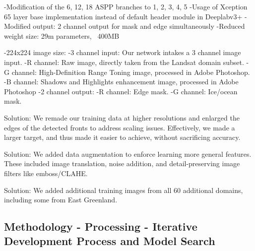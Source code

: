 \documentclass[tc, manuscript]{copernicus}
\begin{document}
-Modification of the 6, 12, 18 ASPP branches to 1, 2, 3, 4, 5
-Usage of Xception 65 layer base implementation instead of default header module in Deeplabv3+
-Modified output: 2 channel output for mask and edge simultaneously
-Reduced weight size: 29m parameters, ~400MB


-224x224 image size: 
-3 channel input: Our network intakes a 3 channel image input.
    -R channel: Raw image, directly taken from the Landsat domain subset.
    -G channel: High-Definition Range Toning image, processed in Adobe Photoshop.
    -B channel: Shadows and Highlights enhancement image, processed in Adobe Photoshop
-2 channel output:
    -R channel: Edge mask. 
    -G channel: Ice/ocean mask.


Solution: We remade our training data at higher resolutions and enlarged the edges of the detected fronts to address scaling issues. Effectively, we made a larger target, and thus made it easier to achieve, without sacrificing accuracy.

Solution: We added data augmentation to enforce learning more general features. These included image translation, noise addition, and detail-preserving image filters like emboss/CLAHE.

Solution: We added additional training images from all 60 additional domains, including some from East Greenland.

\subsection{Methodology - Processing - Iterative Development Process and Model Search}
\end{document}
